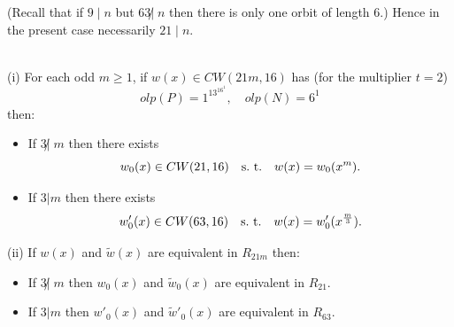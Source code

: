 {{{\begin{enumerate}
\begin{itemize}
	 \end{itemize}
	 (Recall that if $9 \; | \; n$ but $63\not| \; n$ then there is only one orbit 
	 of length 6.) 
	 Hence in the present case necessarily $21 \mid n$.

\begin{thm} \label{th2}
{ \ }\\
(i)    For each odd $m \geq1 $, if $w(x) \in CW(21m,16)$ has (for the 
       multiplier $t=2$) 
		$$olp(P)=1^13^16^1, \quad olp(N)=6^1$$ 
       then:
       \begin{itemize}
	\item If $3 \not| \; m$ then there exists 
		$$w_0(x) \in CW(21,16) \quad {\rm s. \ t.} \quad w(x)=w_0(x^m).$$ 
	\item If $3 | m$ then there exists  
	$$w'_0(x) \in CW(63,16) \quad {\rm s. \ t.} \quad w(x)=w'_0(x^{\frac{m}{3}}).$$ 
	\end{itemize}
	
(ii)  If $w(x)$ and $\widetilde{w}(x)$ are equivalent in $R_{21m}$ then: 
	\begin{itemize}
	  \item 
		If  $3 \not| \; m$ then $w_0(x)$ and $\widetilde{w}_0(x)$ are 
		equivalent in $R_{21}$. 
	  \item 
		If $3 | m$ then $w'_0(x)$ and $\widetilde{w}'_0(x)$ are 
		equivalent in $R_{63}$. 
		
	\end{itemize}
\end{thm}
\begin{pr}
{\rm
{ \ }\\

}
\end{pr}
\end{enumerate}}}}
